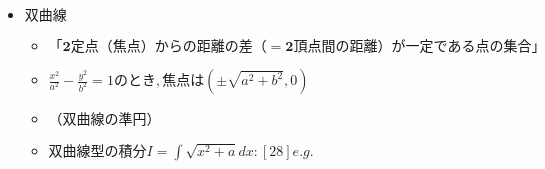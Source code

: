 \documentclass[dvipdfmx,uplatex]{jsarticle}
\begin{document}
\begin{itemize}
\begin{itemize}
\begin{itemize}
\begin{itemize}
				\item $ 真円変換して（距離） = （半径）$
				\item $ 判別式$
			\end{itemize}
		\end{itemize}
		\item $ 焦点から楕円上の点の距離はキレイな式になる:xまたはyの差の定数倍[33]$
		\item $ ax + by = 1を(a,b)を極とする円x^2+y^2=1の極線という[32]$
		\begin{itemize}
			\item $ (a,b)が円周上にあるなら接線と一致$
			\item $ 外部の点なら(a,b)を通る2接線の接点を通る直線$
			\item $ [32];Cを曲線a^2x^2+y2=1, lを直線y=ax+2aとする。 ただ
				し， aは正の定数である．$ \\ 
				$ (1)Cとlとが異なる2点で交わるためのaの範囲を求めよ．$ \\
				$ (2) C上の点(x_O,y_0)における接線の方程式を求めよ．$ \\
				$ (3) (1)における交点をP, Qとし，点PにおけるCの接線と点Qに
				おけるCの接線との交点をR(X､ Y）とする． aが(1)の範囲を動く
				とき, X, Yの関係式とYの範囲を求めよ．$
			\item $ P,Qをそれぞれ(x_p,y_p),(x_q,y_q）
			とおくと，直線PR, QRの方程式は$ \\
			$a^2x_px+y_py=1, a^2x_qx+y_qy=1$ \\
			$となる． これらがR(X,Y)を通ることより$ \\
			$ a^2x_pX+y_pY=1, a^2x_qX+y_qY=1$ \\
			$ この2式は2点P,Qが$ \\
			$ a^2Xx+Yy=1$ \\
			$ 上にあることを示している.つまり上式はlと一致する.ゆえに係数を比較して$ \\
			$ X = - \frac{1}{2a^2} , Y = \frac{1}{2a}$$(以下略)$
		\end{itemize}
	\end{itemize}
	\item $ 双曲線$
	\begin{itemize}
		\item $ \bm{「2定点（焦点）からの距離の差（=2頂点間の距離）が一定である点の集合」}$
		\item $ \frac{x^2}{a^2}- \frac{y^2}{b^2}=1のとき,焦点は( \pm \sqrt{a^2+b^2},0)$
		\item $ （双曲線の準円）$
		\item $ 双曲線型の積分I= \int \sqrt{x^2+a}dx:[28]e.g.$

\end{itemize}
\end{itemize}
\end{document}
